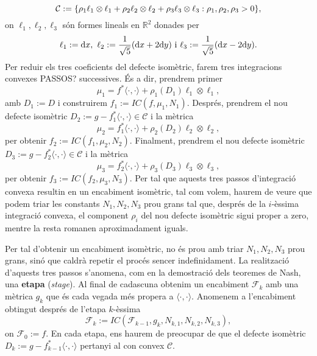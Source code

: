 \begin{equation*}
    \mathcal C:=\{\rho_1\ell_1\otimes\ell_1 + \rho_2\ell_2\otimes\ell_2 + \rho_3\ell_3\otimes\ell_3 : \rho_1, \rho_2, \rho_3 > 0\},
\end{equation*}
on $\ell_1, \ell_2, \ell_3$ són formes lineals en $\mathbb R^2$ donades per 
\begin{equation*}
    \ell_1:=\text dx, \text{ } \ell_2:=\frac{1}{\sqrt5}(\text dx + 2\text dy) \text{ i } \ell_3:=\frac{1}{\sqrt5}(\text dx - 2\text dy).
\end{equation*}
Per reduir els tres coeficients del defecte isomètric, farem tres integracions convexes {\color{blue} PASSOS?} successives. És a dir, prendrem primer
\begin{equation*}
    \mu_1 = f^*\langle\cdot, \cdot\rangle + \rho_1(D_1)\ell_1\otimes\ell_1,
\end{equation*}
amb $D_1:=D$ i construirem $f_1:=IC(f, \mu_1, N_1)$. Després, prendrem el nou defecte isomètric $D_2 := g-f_1^*\langle\cdot, \cdot\rangle\in\mathcal C$ i la mètrica
\begin{equation*}
    \mu_2 = f_1^*\langle\cdot, \cdot\rangle + \rho_2(D_2)\ell_2\otimes\ell_2,
\end{equation*}
 per obtenir $f_2:=IC(f_1, \mu_2, N_2)$. Finalment, prendrem el nou defecte isomètric $D_3 := g-f_2^*\langle\cdot, \cdot\rangle\in\mathcal C$ i la mètrica
\begin{equation*}
    \mu_3 = f_2^*\langle\cdot, \cdot\rangle + \rho_3(D_3)\ell_3\otimes\ell_3,
\end{equation*}
per obtenir $f_3:=IC(f_2, \mu_3, N_3)$. Per tal que aquests tres passos d'integració convexa resultin en un encabiment isomètric, tal com volem, haurem de veure que podem triar les constants $N_1, N_2, N_3$ prou grans tal que, després de la $i$-èssima integració convexa, el component $\rho_i$ del nou defecte isomètric sigui proper a zero, mentre la resta romanen aproximadament iguals. 

Per tal d'obtenir un encabiment isomètric, no és prou amb triar $N_1, N_2, N_3$ prou grans, sinó que caldrà repetir el procés sencer indefinidament. La realització d'aquests tres passos s'anomena, com en la demostració dels teoremes de Nash, una \textbf{etapa} (\textit{stage}). Al final de cadascuna obtenim un encabiment $\mathcal F_k$ amb una mètrica $g_k$ que és cada vegada més propera a $\langle\cdot, \cdot\rangle$. Anomenem a l'encabiment obtingut després de l'etapa $k$-èssima 
\begin{equation*}
    \mathcal F_k:=IC(\mathcal F_{k-1}, g_k, N_{k,1}, N_{k,2}, N_{k,3}),
\end{equation*}
on $\mathcal F_0:=f$. En cada etapa, ens haurem de preocupar de que el defecte isomètric $D_k:=g-f_{k-1}^*\langle\cdot, \cdot\rangle$ pertanyi al con convex $\mathcal C$.

